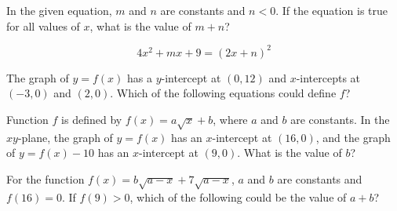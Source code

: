 
\vspace{2em}

\noindent\markforreview
\vspace{1em}

In the given equation, $m$ and $n$ are constants and $n < 0$. If the equation is true for all values of $x$, what is the value of $m + n$?

\[
4x^2 + mx + 9 = (2x + n)^2
\]

\vspace{0.75em}


\vspace{2em}

\noindent\markforreview
\vspace{1em}

The graph of $y = f(x)$ has a $y$-intercept at $(0, 12)$ and $x$-intercepts at $(-3, 0)$ and $(2, 0)$. Which of the following equations could define $f$?

\vspace{0.75em}


\vspace{2em}

\noindent\markforreview
\vspace{1em}

Function $f$ is defined by $f(x) = a\sqrt{x} + b$, where $a$ and $b$ are constants. In the $xy$-plane, the graph of $y = f(x)$ has an $x$-intercept at $(16, 0)$, and the graph of $y = f(x) - 10$ has an $x$-intercept at $(9, 0)$. What is the value of $b$?

\vspace{2em}

\noindent\markforreview
\vspace{1em}

For the function $f(x) = b\sqrt{a - x} + 7\sqrt{a - x}$, $a$ and $b$ are constants and $f(16) = 0$. If $f(9) > 0$, which of the following could be the value of $a + b$?

\vspace{0.75em}


